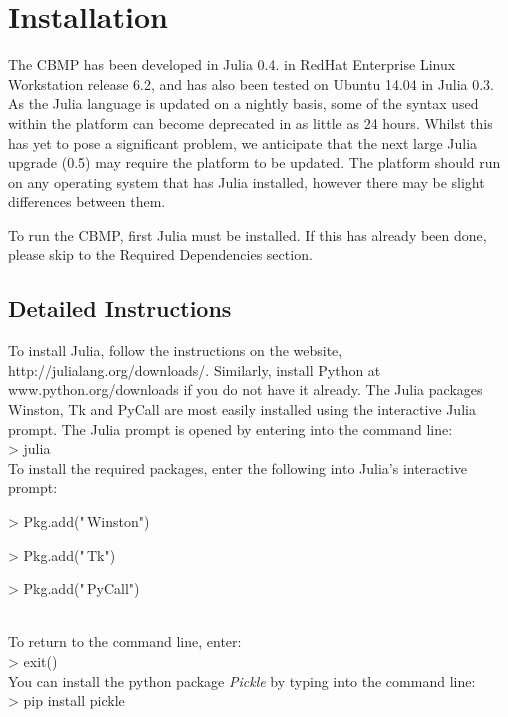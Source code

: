\documentclass[12pt]{article}
\begin{document}
\section{Installation}
The CBMP has been developed in Julia 0.4. in RedHat Enterprise Linux 
Workstation release 6.2, and has also been tested on Ubuntu 14.04 in 
Julia 0.3. As the Julia language is updated on a nightly basis, some of 
the syntax used within the platform can become deprecated in as little 
as 24 hours. Whilst this has yet to pose a significant problem, we 
anticipate that the next large Julia upgrade (0.5) may require the 
platform to be updated. The platform should run on any operating system 
that has Julia installed, however there may be slight differences 
between them.

To run the CBMP, first Julia must be installed. If this has already been 
done, please skip to the Required Dependencies section.

\subsection{Detailed Instructions}
To install Julia, follow the instructions on the website, 
http://julialang.org/downloads/. Similarly,
install Python at www.python.org/downloads if you do not have it already. 
The Julia packages Winston, Tk and PyCall are most easily installed 
using the interactive Julia prompt. The Julia prompt is opened by entering
into the command line: \\

{\fontsize{11pt}{11pt} \ttfamily 
> julia} \\

To install the required packages, enter the following into Julia's interactive prompt: \\

{\fontsize{11pt}{11pt} \ttfamily 
> Pkg.add("\,Winston")

> Pkg.add("\,Tk")

> Pkg.add("\,PyCall")} \\ 

To return to the command line, enter: \\

{\fontsize{11pt}{11pt} \ttfamily 
> exit()} \\

You can install the python package {\itshape Pickle} by typing into the command line: \\

{\fontsize{11pt}{11pt} \ttfamily 
> pip install pickle} \\
\end{document}
